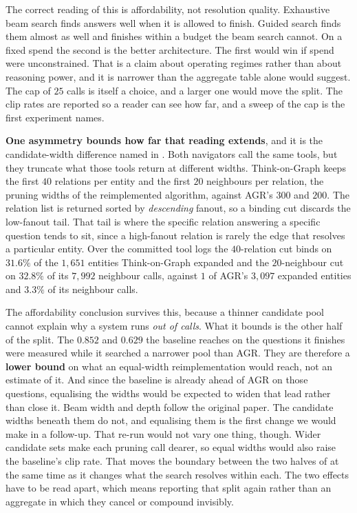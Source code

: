 The correct reading of this is affordability, not resolution quality.
Exhaustive beam search finds answers well when it is allowed to finish.
Guided search finds them almost as well and finishes within a budget the
beam search cannot. On a fixed spend the second is the better
architecture. The first would win if spend were unconstrained. That is a
claim about operating regimes rather than about reasoning power, and it
is narrower than the aggregate table alone would suggest. The cap of
$25$ calls is itself a choice, and a larger one would move the split.
The clip rates are reported so a reader can see how far, and a sweep of
the cap is the first experiment  names.

\textbf{One asymmetry bounds how far that reading extends}, and it is
the candidate-width difference named in . Both
navigators call the same tools, but they truncate what those tools
return at different widths. Think-on-Graph keeps the first $40$
relations per entity and the first $20$ neighbours per relation, the
pruning widths of the reimplemented algorithm, against AGR's $300$ and
$200$. The relation list is returned sorted by \emph{descending} fanout,
so a binding cut discards the low-fanout tail. That tail is where the
specific relation answering a specific question tends to sit, since a
high-fanout relation is rarely the edge that resolves a particular
entity. Over the committed tool logs the $40$-relation cut binds on
$31.6\%$ of the $1{,}651$ entities Think-on-Graph expanded and the
$20$-neighbour cut on $32.8\%$ of its $7{,}992$ neighbour calls, against
$1$ of AGR's $3{,}097$ expanded entities and $3.3\%$ of its neighbour
calls.

The affordability conclusion survives this, because a thinner candidate
pool cannot explain why a system runs \emph{out of calls}. What it
bounds is the other half of the split. The $0.852$ and $0.629$ the
baseline reaches on the questions it finishes were measured while it
searched a narrower pool than AGR. They are therefore a \textbf{lower
bound} on what an equal-width reimplementation would reach, not an
estimate of it. And since the baseline is already ahead of AGR on those
questions, equalising the widths would be expected to widen that lead
rather than close it. Beam width and depth follow the original paper.
The candidate widths beneath them do not, and equalising them is the
first change we would make in a follow-up. That re-run would not vary
one thing, though. Wider candidate sets make each pruning call dearer,
so equal widths would also raise the baseline's clip rate. That moves
the boundary between the two halves of  at the same
time as it changes what the search resolves within each. The two effects
have to be read apart, which means reporting that split again rather
than an aggregate in which they cancel or compound invisibly.

